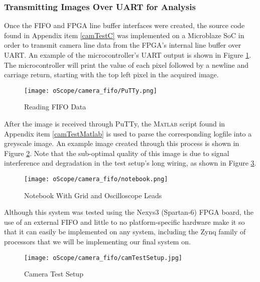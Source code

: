 \subsubsection{Transmitting Images Over UART for Analysis} \label{UARTimg}
Once the FIFO and FPGA line buffer interfaces were created, the source code found in Appendix item \ref{camTestC} was implemented on a Microblaze SoC in order to transmit camera line data from the FPGA's internal line buffer over UART. An example of the microcontroller's UART output is shown in Figure \ref{PuTTYfifoData}. The microcontroller will print the value of each pixel followed by a newline and carriage return, starting with the top left pixel in the acquired image. 
\begin{figure}[H]
	\centerline{\texttt{[image: oScope/camera\_fifo/PuTTy.png]}}
	\caption{Reading FIFO Data}
	\label{PuTTYfifoData}
\end{figure}
\par
After the image is received through PuTTy, the \textsc{Matlab} script found in Appendix item \ref{camTestMatlab} is used to parse the corresponding logfile into a greyscale image. An example image created through this process is shown in Figure \ref{notebookImage}. Note that the sub-optimal quality of this image is due to signal interference and degradation in the test setup's long wiring, as shown in Figure \ref{camTestSetup}. 
\begin{figure}[H]
	\centerline{\texttt{[image: oScope/camera\_fifo/notebook.png]}}
	\caption{Notebook With Grid and Oscilloscope Leads}
	\label{notebookImage}
\end{figure}
\par
Although this system was tested using the Nexys3 (Spartan-6) FPGA board, the use of an external FIFO and little to no platform-specific hardware make it so that it can easily be implemented on any system, including the Zynq family of processors that we will be implementing our final system on.   
\begin{figure}[H]
	\centerline{\texttt{[image: oScope/camera\_fifo/camTestSetup.jpg]}}
	\caption{Camera Test Setup}
	\label{camTestSetup}
\end{figure}

